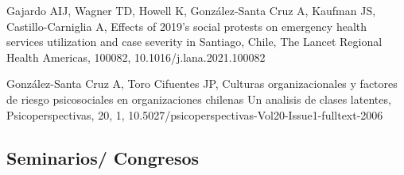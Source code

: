 \documentclass[11pt,a4paper,]{awesome-cv}
\begin{document}
\begin{cventries}
{\begin{cvitems}
\item Gajardo AIJ, Wagner TD, Howell K, González-Santa Cruz A, Kaufman JS, Castillo-Carniglia A, Effects of 2019's social protests on emergency health services utilization and case severity in Santiago, Chile, The Lancet Regional Health Americas, 100082, 10.1016/j.lana.2021.100082
\item González-Santa Cruz A, Toro Cifuentes JP, Culturas organizacionales y factores de riesgo psicosociales en organizaciones chilenas Un analisis de clases latentes, Psicoperspectivas, 20, 1, 10.5027/psicoperspectivas-Vol20-Issue1-fulltext-2006
\end{cvitems}}
\end{cventries}

\hypertarget{seminarios-congresos-1}{%
\subsection{Seminarios/ Congresos}\label{seminarios-congresos-1}}
\end{document}
